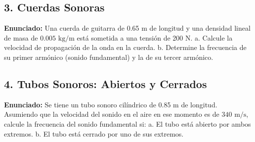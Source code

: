 \documentclass[12pt, letterpaper]{article}
\begin{document}

\subsection*{3. Cuerdas Sonoras}
\noindent \textbf{Enunciado:} Una cuerda de guitarra de 0.65 m de longitud y una densidad lineal de masa de $0.005 \text{ kg/m}$ está sometida a una tensión de 200 N. a. Calcule la velocidad de propagación de la onda en la cuerda. b. Determine la frecuencia de su primer armónico (sonido fundamental) y la de su tercer armónico.


\subsection*{4. Tubos Sonoros: Abiertos y Cerrados}
\noindent \textbf{Enunciado:} Se tiene un tubo sonoro cilíndrico de 0.85 m de longitud. Asumiendo que la velocidad del sonido en el aire en ese momento es de $340 \text{ m/s}$, calcule la frecuencia del sonido fundamental si: a. El tubo está abierto por ambos extremos. b. El tubo está cerrado por uno de sus extremos.
\end{document}
